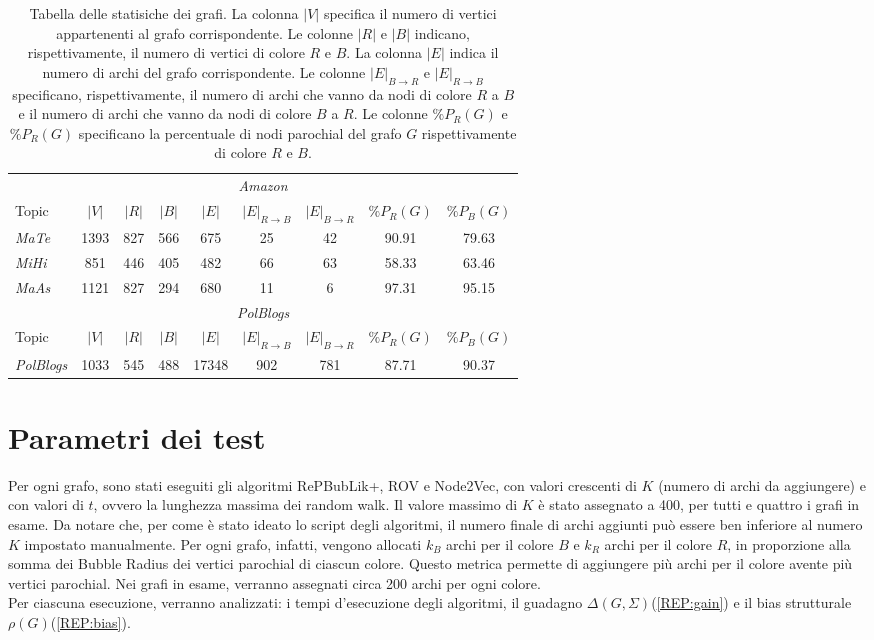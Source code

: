 \begin{table}[!h]
    \centering
    \begin{tabular}{lcccccccc}
        \hline
        \multicolumn{9}{c}{\emph{Amazon}} \\
        Topic    & $|V|$ &  $|R|$ & $|B|$ & $|E|$ &  $|E|_{R \to B}$ & $|E|_{B \to R}$ & $\%P_R(G)$ & $\%P_B(G)$\\
        \hline
        \emph{MaTe} & 1393 & 827 & 566 & 675 & 25 & 42 &  90.91 & 79.63\\
        \emph{MiHi} & 851 & 446 & 405 & 482 & 66 & 63 &  58.33 & 63.46\\
        \emph{MaAs} & 1121 &827 & 294 & 680 & 11 & 6 &  97.31 & 95.15\\
        \hline
        \multicolumn{9}{c}{\emph{PolBlogs}} \\
        Topic    & $|V|$ & $|R|$ & $|B|$ & $|E|$ & $|E|_{R \to B}$ & $|E|_{B \to R}$ & $\%P_R(G)$ & $\%P_B(G)$\\
        \hline
        \emph{PolBlogs} & 1033 & 545 & 488 & 17348 & 902 & 781 &  87.71 & 90.37\\
        \hline
    \end{tabular}
    \caption{Tabella delle statisiche dei grafi.
    La colonna $|V|$ specifica il numero di vertici appartenenti al grafo corrispondente.
    Le colonne $|R|$ e $|B|$ indicano, rispettivamente, il numero di vertici di colore $R$ e $B$. 
    La colonna $|E|$ indica il numero di archi del grafo corrispondente.
    Le colonne $|E|_{B \to R}$ e $|E|_{R \to B}$ specificano, rispettivamente, il numero di archi che vanno da nodi di colore $R$ a $B$ e  il numero di archi che vanno da nodi di colore $B$ a $R$.
    Le colonne $\%P_{R}(G)$ e $\%P_{R}(G)$ specificano la percentuale di nodi parochial del grafo $G$ rispettivamente di colore $R$ e $B$.}
\end{table} 
\section{Parametri dei test}
Per ogni grafo, sono stati eseguiti gli algoritmi RePBubLik+, ROV e Node2Vec, con valori crescenti
di $K$ (numero di archi da aggiungere) e con valori di $t$, ovvero la lunghezza massima dei random walk. 
Il valore massimo di $K$ è stato assegnato a 400, per tutti e quattro i grafi in esame.
Da notare che, per come è stato ideato lo script degli algoritmi, il numero finale di archi aggiunti
può essere ben inferiore al numero $K$ impostato manualmente. Per ogni grafo, infatti, vengono allocati $k_B$ archi per il colore $B$ e $k_R$ archi 
per il colore $R$, in proporzione alla somma dei Bubble Radius dei vertici parochial di ciascun colore.
Questo metrica permette di aggiungere più archi per il colore avente più vertici parochial.
Nei grafi in esame, verranno assegnati circa 200 archi per ogni colore.
\\
Per ciascuna esecuzione, verranno analizzati: i tempi d'esecuzione degli algoritmi, il guadagno $\Delta(G,\Sigma)$(\ref{REP:gain}) e il bias strutturale $\rho(G)$(\ref{REP:bias}).
